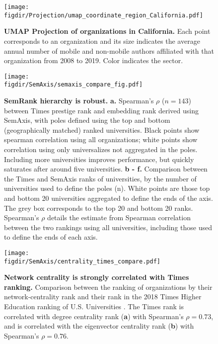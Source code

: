 \documentclass[12pt]{article} %
\def\figdir{../Figs}
\begin{document}
%
%
\begin{figure}[hp!]
	\centering
	\texttt{[image: \\figdir/Projection/umap\_coordinate\_region\_California.pdf]}
	\caption{
		\textbf{UMAP Projection of organizations in California.}
		Each point corresponds to an organization and its size indicates the average annual number of mobile and non-mobile authors affiliated with that organization from 2008 to 2019.
		Color indicates the sector.
	}
	\label{fig:supp:proj_california}
\end{figure}




%
%
\begin{figure}[hp!]
	\centering
	\texttt{[image: \\figdir/SemAxis/semaxis\_compare\_fig.pdf]}
	\caption{
		\textbf{SemRank hierarchy is robust.}
		\textbf{a.} Spearman's $\rho$ ($n = 143$) between Times prestige rank and embedding rank derived using SemAxis, with poles defined using the top and bottom (geographically matched) ranked universities.
		Black points show spearman correlation using all organizations; white points show correlation using only universalizes not aggregated in the poles.
		Including more universities improves performance, but quickly saturates after around five universities.
		\textbf{b - f.} Comparison between the Times and SemAxis ranks of universities, by the number of universities used to define the poles (n).
		White points are those top and bottom 20 universities aggregated to define the ends of the axis.
		The grey box corresponds to the top 20 and bottom 20 ranks.
	  	Spearman's $\rho$ details the estimate from Spearman correlation between the two rankings using all universities, including those used to define the ends of each axis.
	}
	\label{fig:supp:semaxis_compare}
\end{figure}



%
%
\begin{figure}[hp!]
	\centering
	\texttt{[image: \\figdir/SemAxis/centrality\_times\_compare.pdf]}
	\caption{
		\textbf{Network centrality is strongly correlated with Times ranking.}
		Comparison between the ranking of organizations by their network-centrality rank and their rank in the 2018 Times Higher Education ranking of U.S. Universities .
		The Times rank is correlated with degree centrality rank (\textbf{a}) with Spearman's $\rho = 0.73$, and is correlated with the eigenvector centrality rank (\textbf{b}) with Spearman's $\rho = 0.76$.
	}
	\label{fig:supp:centrality_times_compare}
\end{figure}
\end{document}
